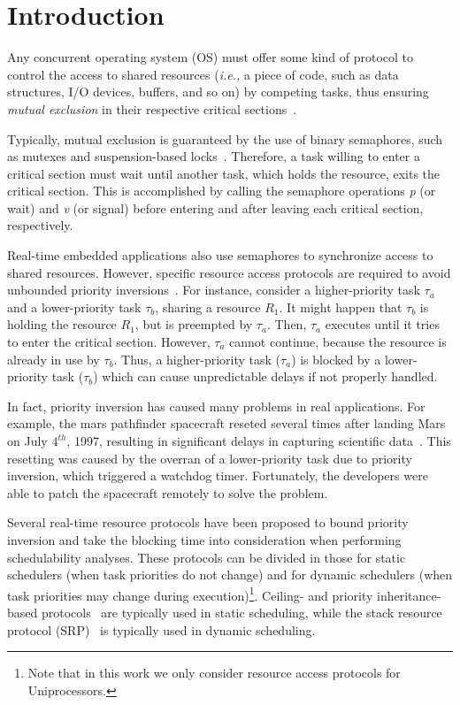 \section{Introduction}
\label{sec:intro}

Any concurrent operating system (OS) must offer some kind of protocol to 
control the access to shared resources (\emph{i.e.,} a piece of code, such as 
data structures, I/O devices, buffers, and so on) by competing tasks, thus 
ensuring \emph{mutual exclusion} in their respective critical 
sections~\cite{Liu:2000,Buttazzo:2011}. 

Typically, mutual exclusion is guaranteed by the use of binary semaphores, such 
as mutexes and suspension-based locks~\cite{Yang:2015}. Therefore, a task 
willing to enter a critical section must wait until another task, which holds 
the resource, exits the critical section. This is accomplished by calling the 
semaphore operations \emph{p} (or wait) and \emph{v} (or signal) before 
entering and after leaving each critical section, respectively.

Real-time embedded applications also use semaphores to synchronize access to 
shared resources. However, specific resource access protocols are required to 
avoid unbounded priority inversions~\cite{Liu:2000,Buttazzo:2011,Yang:2015}. 
For instance, consider a higher-priority task $\tau_a$ and a lower-priority 
task $\tau_b$, sharing a resource $R_1$. It might happen that $\tau_b$ is 
holding the resource $R_1$, but is preempted by $\tau_a$. Then, $\tau_a$ 
executes until it tries to enter the critical section. However, $\tau_a$ cannot 
continue, because the resource is already in use by $\tau_b$. Thus, a 
higher-priority task ($\tau_a$) is blocked by a lower-priority task ($\tau_b$) 
which can cause unpredictable delays if not properly handled.

In fact, priority inversion has caused many problems in real applications. For 
example, the mars pathfinder spacecraft reseted several times after landing 
Mars on July $4^{th}$, 1997, resulting in significant delays in capturing 
scientific data~\cite{Jones:1997,Reeves:1997}. This resetting was caused by the 
overran of a lower-priority task due to priority inversion, which triggered a 
watchdog timer. Fortunately, the developers were able to patch the spacecraft 
remotely to solve the problem.  

Several real-time resource protocols have been proposed to bound priority 
inversion and take the blocking time into consideration when performing 
schedulability analyses. These protocols can be divided in those for static 
schedulers (when task priorities do not change) and for dynamic schedulers 
(when task priorities may change during execution)\footnote{Note that in this 
work we only consider resource access protocols for Uniprocessors.}. Ceiling- 
and priority inheritance-based protocols~\cite{Sha:1990} are typically used in 
static scheduling, while the stack resource protocol (SRP)~\cite{Baker:1991} is 
typically used in dynamic scheduling.


